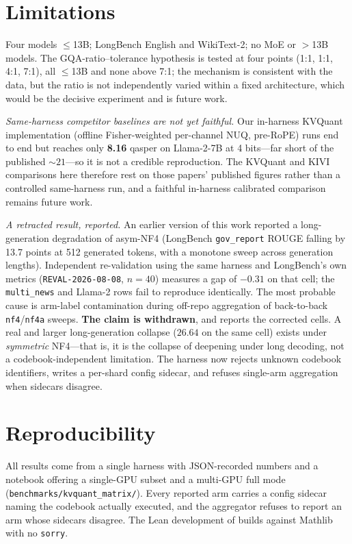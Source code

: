\documentclass{article}
\theoremstyle{plain}
\theoremstyle{definition}
\begin{document}
\section{Limitations}
\label{sec:limits}
Four models $\le$13B; LongBench English and WikiText-2; no MoE or $>$13B models. The
GQA-ratio--tolerance hypothesis is tested at four points (1:1, 1:1, 4:1, 7:1), all $\le$13B and
none above 7:1; the mechanism is consistent with the data, but the ratio is not independently
varied within a fixed architecture, which would be the decisive experiment and is future work.

\emph{Same-harness competitor baselines are not yet faithful.} Our in-harness
KVQuant~\citep{hooper2024kvquant} implementation (offline Fisher-weighted per-channel NUQ,
pre-RoPE) runs end to end but reaches only \textbf{8.16} qasper on Llama-2-7B at 4 bits---far
short of the published ${\sim}21$---so it is not a credible reproduction. The KVQuant and
KIVI~\citep{liu2024kivi} comparisons here therefore rest on those papers' published figures
rather than a controlled same-harness run, and a faithful in-harness calibrated comparison
remains future work.

\emph{A retracted result, reported.} An earlier version of this work reported a
long-generation degradation of asym-NF4 (LongBench \texttt{gov\_report} ROUGE falling by 13.7
points at 512 generated tokens, with a monotone sweep across generation lengths). Independent
re-validation using the same harness and LongBench's own metrics
(\texttt{REVAL-2026-08-08}, $n{=}40$) measures a gap of $-0.31$ on that cell; the
\texttt{multi\_news} and Llama-2 rows fail to reproduce identically. The most probable cause is
arm-label contamination during off-repo aggregation of back-to-back \texttt{nf4}/\texttt{nf4a}
sweeps. \textbf{The claim is withdrawn}, and  reports the corrected cells. A real and larger long-generation collapse
($26.64$ on the same cell) exists under \emph{symmetric} NF4---that is, it is the collapse of
 deepening under long decoding, not a codebook-independent limitation. The
harness now rejects unknown codebook identifiers, writes a per-shard config sidecar, and
refuses single-arm aggregation when sidecars disagree.

\section{Reproducibility}
\label{sec:repro}
All results come from a single harness with JSON-recorded numbers and a notebook offering a
single-GPU subset and a multi-GPU full mode (\texttt{benchmarks/kvquant\_matrix/}). Every
reported arm carries a config sidecar naming the codebook actually executed, and the aggregator
refuses to report an arm whose sidecars disagree. The Lean development of 
builds against Mathlib with no \texttt{sorry}.



\end{document}
